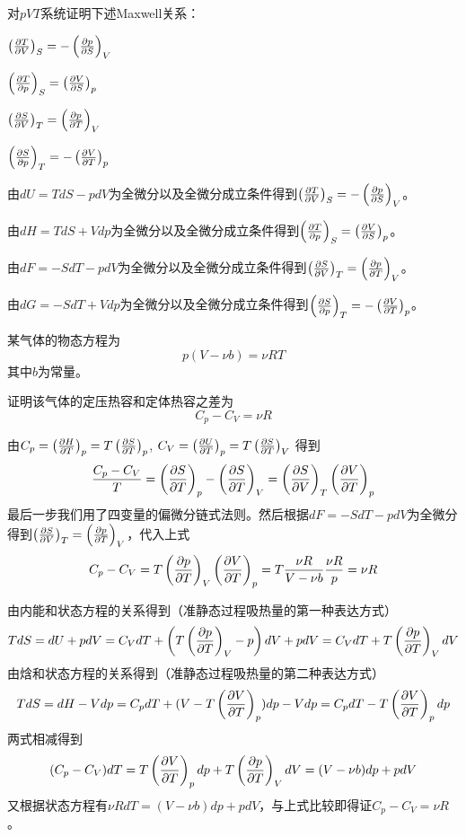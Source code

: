 \documentclass[CJK]{beamer}
\begin{document}
\begin{frame}
  \chtitle{\proid (\stwo)}
  \bch
  对$pVT$系统证明下述Maxwell关系：
\bitem
\item{$\pfrac TVS = -\pfrac pSV$}
\item{$\pfrac TpS = \pfrac VSp$}
\item{$\pfrac SVT = \pfrac pTV$}
\item{$\pfrac SpT = -\pfrac VTp$}
\eitem
\ech
\end{frame}

\begin{frame}
  \bch
\bitem
\item{由$dU = TdS - pdV$为全微分以及全微分成立条件得到$\pfrac TVS = -\pfrac pSV$。}
\item{由$dH = TdS + Vdp$为全微分以及全微分成立条件得到$\pfrac TpS = \pfrac VSp$。}
\item{由$dF = -SdT - pdV$为全微分以及全微分成立条件得到$\pfrac SVT = \pfrac pTV$。}
\item{由$dG = -SdT + Vdp$为全微分以及全微分成立条件得到$\pfrac SpT = -\pfrac VTp$。}
\eitem
  \ech
\end{frame}

\begin{frame}
  \chtitle{\proid (\sthree)}
  \bch
某气体的物态方程为
$$p(V-\nu b) = \nu R T$$
其中$b$为常量。

证明该气体的定压热容和定体热容之差为
$$ C_p - C_V = \nu R $$

  \ech
\end{frame}

\begin{frame}
  \bch
由$C_p  =\pfrac HTp = T \pfrac STp$, $C_V = \pfrac UTp = T\pfrac STV$
得到
$$\frac{C_p - C_V}{T} = \pfrac STp - \pfrac STV = \pfrac SVT  \pfrac VTp $$
最后一步我们用了四变量的偏微分链式法则。然后根据$dF = - SdT - pdV$为全微分得到$\pfrac SVT = \pfrac pTV$，代入上式
$$ C_p - C_V = T\pfrac pTV \pfrac VTp = T \frac{\nu R}{V-\nu b} \frac{\nu R}{p} = \nu R$$

  \ech
\end{frame}


\begin{frame}
  \bch
由内能和状态方程的关系得到（准静态过程吸热量的第一种表达方式）
{\scriptsize 
$$ T dS  = dU + pdV = C_V dT + \left(T\pfrac pTV -p\right)dV+pdV = C_V dT + T\pfrac pTV dV  $$}
由焓和状态方程的关系得到（准静态过程吸热量的第二种表达方式）
{\scriptsize 
$$ TdS = dH - Vdp = C_p dT + (V-T\pfrac VTp)dp - Vdp = C_p dT - T\pfrac VTp dp$$}
两式相减得到
$$ (C_p- C_V)dT =  T\pfrac VTp dp + T\pfrac pTV dV = (V-\nu b)dp + p dV $$
又根据状态方程有$ \nu R dT = (V-\nu b) dp + p dV$，与上式比较即得证$C_p - C_V = \nu R$。
  \ech
\end{frame}
\end{document}
